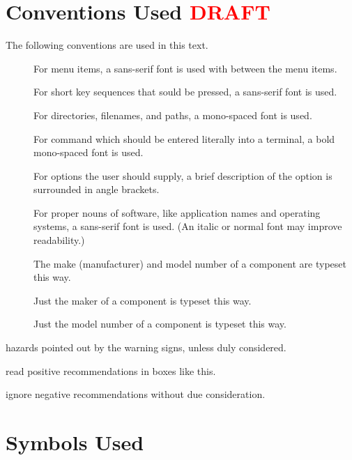 \section{Conventions Used \textcolor{red}{DRAFT}}

The following conventions are used in this text.

\begin{description}

  \item[] For menu items, a sans-serif font is
    used with \menusep between the menu items.
  \item[] For short key sequences that sould be pressed, a sans-serif font is used.
  \item[] For directories, filenames, and paths, a mono-spaced font is used.
  \item[] For command which should be
    entered literally into a terminal, a bold mono-spaced font is used.
  \item[] For options the user should supply,
    a brief description of the option is surrounded in angle brackets.
  \item[] For proper nouns of software, like application names and operating systems, a sans-serif font is used. (\FIXME An italic or normal font may improve readability.)
  \item[] The make (manufacturer) and model number of a component are typeset this way.
  \item[] Just the maker of a component is typeset this way.
  \item[] Just the model number of a component is typeset this way.

\end{description}


\begin{avoid} hazards pointed out by the warning signs, unless duly considered. \end{avoid}
\begin{pleasedo} read positive recommendations in boxes like this. \end{pleasedo}
\begin{pleasedonot} ignore negative recommendations without due consideration. \end{pleasedonot}

\section{Symbols Used}
\label{sec:intro:symbols}

